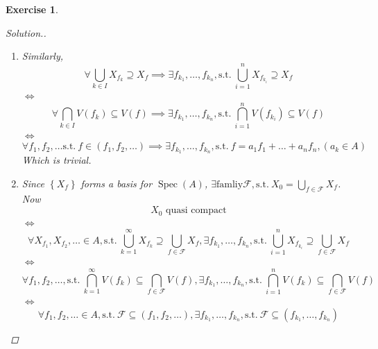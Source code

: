 \documentclass{article}
\theoremstyle{breakstyle}
\newtheorem{exercise}{Exercise}
\newenvironment{solution}
  {\begin{proof}[Solution.]\renewcommand{\qedsymbol}{}}
  {\end{proof}}
\DeclareMathOperator{\spec}{Spec}
\begin{document}
\begin{exercise}
\begin{solution}
\begin{enumerate}[label=({\roman*})]
                When $\forall (f_1,f_2,\ldots )=(1)$, $\exists g_{k_1},\ldots ,g_{k_{n}}\in A,
                \mathrm{s.t.}\ 1=\sum_{}^{} a_{k_{i}}f_{k_{i}},a\in A$,
                which implies $(1)=(f_{k_1},\ldots ,f_{k_{n}})$.
            \item Similarly,
                $$
                \forall \bigcup_{k \in I} X_{f_{k}}\supseteq  X_{f}
                \implies\exists f_{k_1},\ldots ,f_{k_{n}},\mathrm{s.t.}\ \bigcup_{i=1 }^{n}X_{f_{k_{i}}}\supseteq X_{f}
                $$
                $\Leftrightarrow$ 
                $$
                \forall \bigcap_{k\in I} V(f_{k})\subseteq V(f)
                \implies\exists f_{k_1},\ldots ,f_{k_{n}},\mathrm{s.t.}\ \bigcap_{i =1} ^{n}V(f_{k_{i}})\subseteq V(f)
                $$
                $\Leftrightarrow$ 
                $$
                \forall f_1,f_2,\ldots \mathrm{s.t.}\ f\in (f_1,f_2,\ldots )
                \implies\exists f_{k_1},\ldots ,f_{k_{n}},\mathrm{s.t.}\ f=a_1f_1+\ldots +a_{n}f_{n},(a_{k}\in A)
                $$
                Which is trivial.
            \item Since $\left\{ X_{f} \right\} $ forms a basis for $\spec(A)$,
                $\exists \text{famliy}\mathcal{F},\mathrm{s.t.}\ X_0=\bigcup_{f \in \mathcal{F}} X_{f}$.
                Now
                $$
                X_0\text{ quasi compact}
                $$
                $\Leftrightarrow$
                $$
                \forall X_{f_1},X_{f_2},\ldots \in A,
                \mathrm{s.t.}\ \bigcup_{k =1} ^{\infty}X_{f_{k}}\supseteq \bigcup_{f \in \mathcal{F}} X_{f},
                \exists f_{k_1},\ldots ,f_{k_{n}},
                \mathrm{s.t.}\ \bigcup_{i=1} ^{n}X_{f_{k_{i}}}\supseteq \bigcup_{f \in \mathcal{F}} X_{f}
                $$
                $\Leftrightarrow$ 
                $$
                \forall f_1,f_2,\ldots ,
                \mathrm{s.t.}\ \bigcap_{k =1} ^{\infty}V(f_{k})\subseteq \bigcap_{f \in \mathcal{F}} V(f),
                \exists f_{k_1},\ldots ,f_{k_{n}},
                \mathrm{s.t.}\ \bigcap_{i =1} ^{n}V(f_{k})\subseteq \bigcap_{f \in \mathcal{F}} V(f)
                $$
                $\Leftrightarrow$ 
                $$
                \forall f_1,f_2,\ldots \in A,
                \mathrm{s.t.}\ \mathcal{F}\subseteq (f_1,f_2,\ldots ),
                \exists f_{k_1},\ldots ,f_{k_{n}},
                \mathrm{s.t.}\ \mathcal{F}\subseteq (f_{k_1},\ldots ,f_{k_{n}})
$$
\end{enumerate}
\end{solution}
\end{exercise}
\end{document}
